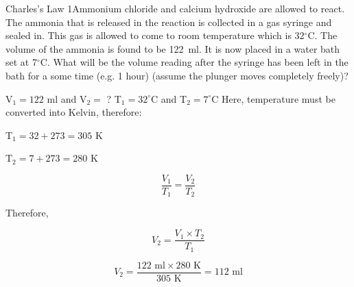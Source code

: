 \begin{wex}{Charles's Law 1}{Ammonium chloride and calcium hydroxide are allowed to react. The ammonia that is released in the reaction is collected in a gas syringe and sealed in. This gas is allowed to come to room temperature which is 32$^\circ$C. The volume of the ammonia is found to be 122~ml. It is now placed in a water bath set at 7$^\circ$C. What will be the volume reading after the syringe has been left in the bath for a some time (e.g. 1 hour) (assume the plunger moves completely freely)?}{
V$_{1} = 122$ ml and V$_{2} =$ ?
T$_{1} = 32^{\circ}$C and T$_{2} = 7^{\circ}$C
Here, temperature must be converted into Kelvin, therefore:

T$_{1} = 32 + 273 = 305 \text{ K}$

T$_{2} = 7 + 273 = 280 \text{ K}$

\begin{equation*}
\frac{V_{1}}{T_{1}} = \frac{V_{2}}{T_{2}}
\end{equation*}

Therefore,

\begin{equation*}
V_{2} = \frac{V_{1} \times T_{2}}{T_{1}}
\end{equation*}

\begin{equation*}
V_{2} = \frac{122 \text{ ml} \times 280 \text{ K}}{305 \text{ K}} = 112 \text{ ml}
\end{equation*}
}
\end{wex}


